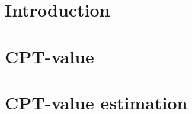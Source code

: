 \documentclass{article}
\begin{document}



\section{Introduction}
\label{sec:introduction}



\section{CPT-value}
\label{sec:cpt-val}




\section{CPT-value estimation} 
\label{sec:cpt-sampling}


\end{document}
